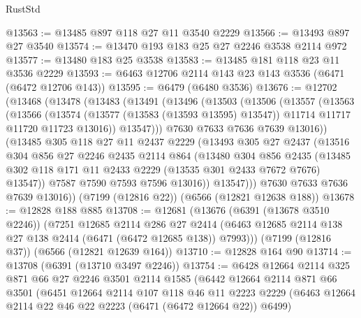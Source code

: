 \begin{lexlean}{RustStd}
\begin{coremodule}
{\begin{coremodule}
{{{{{{{{{{{{{{{{{{{{{{{{{{@13563 := @13485 @897 @118 @27 @11 @3540 @2229
@13566 := @13493 @897 @27 @3540
@13574 := @13470 @193 @183 @25 @27 @2246 @3538 @2114 @972
@13577 := @13480 @183 @25 @3538
@13583 := @13485 @181 @118 @23 @11 @3536 @2229
@13593 := @6463 @12706 @2114 @143 @23 @143 @3536 (@6471 (@6472 @12706 @143))
@13595 := @6479 (@6480 @3536)
@13676 := @12702
    (@13468
      (@13478
        (@13483
          (@13491
            (@13496
              (@13503
                (@13506
                  (@13557
                    (@13563
                      (@13566
                        (@13574
                          (@13577 (@13583 (@13593 @13595) @13547))
                          @11714
                          @11717
                          @11720
                          @11723
                          @13016))
                      @13547)))
                @7630
                @7633
                @7636
                @7639
                @13016))
            (@13485
              @305
              @118
              @27
              @11
              @2437
              @2229
              (@13493
                @305
                @27
                @2437
                (@13516
                  @304
                  @856
                  @27
                  @2246
                  @2435
                  @2114
                  @864
                  (@13480
                    @304
                    @856
                    @2435
                    (@13485 @302 @118 @171 @11 @2433 @2229 (@13535 @301 @2433 @7672 @7676) @13547))
                  @7587
                  @7590
                  @7593
                  @7596
                  @13016))
              @13547)))
        @7630
        @7633
        @7636
        @7639
        @13016))
    (@7199 (@12816 @22))
    (@6566 (@12821 @12638 @188))
@13678 := @12828 @188 @885
@13708 := @12681
    (@13676
      (@6391 (@13678 @3510 @2246))
      (@7251
        @12685
        @2114
        @286
        @27
        @2414
        (@6463 @12685 @2114 @138 @27 @138 @2414 (@6471 (@6472 @12685 @138)) @7993)))
    (@7199 (@12816 @37))
    (@6566 (@12821 @12639 @164))
@13710 := @12828 @164 @90
@13714 := @13708 (@6391 (@13710 @3497 @2246))
@13754 := @6428
    @12664
    @2114
    @325
    @871
    @66
    @27
    @2246
    @3501
    @2114
    @1585
    (@6442
      @12664
      @2114
      @871
      @66
      @3501
      (@6451
        @12664
        @2114
        @107
        @118
        @46
        @11
        @2223
        @2229
        (@6463 @12664 @2114 @22 @46 @22 @2223 (@6471 (@6472 @12664 @22)) @6499)
}}}}}}}}}}}}}}}}}}}}}}}}}}
\end{coremodule}}
\end{coremodule}
\end{lexlean}
